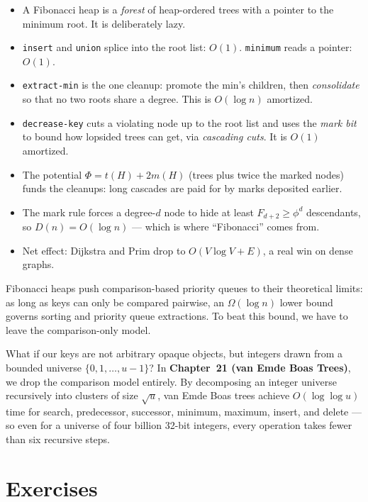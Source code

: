 \begin{focusbox}
\begin{itemize}
  \item A Fibonacci heap is a \emph{forest} of heap-ordered trees with a pointer to
        the minimum root. It is deliberately lazy.
  \item \lstinline|insert| and \lstinline|union| splice into the root list:
        $O(1)$. \lstinline|minimum| reads a pointer: $O(1)$.
  \item \lstinline|extract-min| is the one cleanup: promote the min's children,
        then \emph{consolidate} so that no two roots share a degree. This is
        $O(\log n)$ amortized.
  \item \lstinline|decrease-key| cuts a violating node up to the root list and uses
        the \emph{mark bit} to bound how lopsided trees can get, via \emph{cascading
        cuts}. It is $O(1)$ amortized.
  \item The potential $\Phi = t(H) + 2m(H)$ (trees plus twice the marked nodes)
        funds the cleanups: long cascades are paid for by marks deposited earlier.
  \item The mark rule forces a degree-$d$ node to hide at least $F_{d+2}\ge\phi^d$
        descendants, so $D(n) = O(\log n)$ --- which is where ``Fibonacci'' comes
        from.
  \item Net effect: Dijkstra and Prim drop to $O(V\log V + E)$, a real win on dense
        graphs.
\end{itemize}
\end{focusbox}

Fibonacci heaps push comparison-based priority queues to their theoretical limits:
as long as keys can only be compared pairwise, an $\Omega(\log n)$ lower bound governs
sorting and priority queue extractions. To beat this bound, we have to leave the
comparison-only model.

What if our keys are not arbitrary opaque objects, but integers drawn from a bounded
universe $\{0, 1, \dots, u-1\}$? In \textbf{Chapter~21 (van Emde Boas Trees)}, we drop
the comparison model entirely. By decomposing an integer universe recursively
into clusters of size $\sqrt{u}$, van Emde Boas trees achieve $O(\log \log u)$ time for
search, predecessor, successor, minimum, maximum, insert, and delete --- so even for a universe of four billion 32-bit integers, every operation takes
fewer than six recursive steps.

\section*{Exercises}

